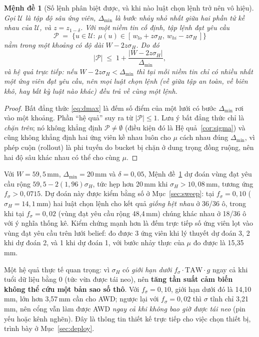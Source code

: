 \documentclass[10pt]{article}
\newtheorem{proposition}{Mệnh đề}[theorem]
\begin{document}
\begin{proposition}[Số lệnh phân biệt được, và khi nào luật chọn lệnh trở nên vô hiệu]
\label{prop:dmax}
Gọi $\mathcal{U}$ là tập độ sâu ứng viên, $\Delta_{\min}$ là bước nhảy nhỏ nhất giữa hai phần tử kề nhau của $\mathcal{U}$, và $z=z_{1-\delta}$. Với một niềm tin cố định, tập lệnh đạt yêu cầu
\[
\mathcal{P} \;=\; \big\{u\in\mathcal{U}:\ \mu(u) \in [\,w_{lo}+z\sigma_H,\ w_{hi}-z\sigma_H\,]\big\}
\]
nằm trong một khoảng có độ dài $W-2z\sigma_H$. Do đó
\begin{equation}
|\mathcal{P}| \;\le\; 1 + \frac{|W-2z\sigma_H|}{\Delta_{\min}},
\label{eq:dmax}
\end{equation}
và hệ quả trực tiếp: nếu $W-2z\sigma_H < \Delta_{\min}$ thì tại \emph{mỗi} niềm tin chỉ có nhiều nhất một ứng viên đạt yêu cầu, nên \emph{mọi} luật chọn lệnh (về giữa tập an toàn, về biên khô, hay bất kỳ luật nào khác) đều trả về cùng một lệnh.
\end{proposition}
\begin{proof}
Bất đẳng thức \eqref{eq:dmax} là đếm số điểm của một lưới có bước $\Delta_{\min}$ rơi vào một khoảng. Phần ``hệ quả'' suy ra từ $|\mathcal{P}|\le 1$. Lưu ý bất đẳng thức chỉ là \emph{chặn trên}; nó không khẳng định $\mathcal{P}\neq\emptyset$ (điều kiện đó là Hệ quả~\ref{cor:sigma}) và cũng không khẳng định hai ứng viên kề nhau luôn cho $\mu$ cách nhau đúng $\Delta_{\min}$, vì phép cuộn (rollout) là phi tuyến do bucket bị chặn ở dung trọng đồng ruộng, nên hai độ sâu khác nhau có thể cho cùng $\mu$.
\end{proof}

Với $W=59{,}5$\,mm, $\Delta_{\min}=20$\,mm và $\delta=0{,}05$, Mệnh đề~\ref{prop:dmax} dự đoán vùng đạt yêu cầu rộng $59{,}5-2(1{,}96)\sigma_H$, tức hẹp hơn 20\,mm khi $\sigma_H>10{,}08$\,mm, tương ứng $f_\sigma>0{,}0715$. Dự đoán này được kiểm bằng số ở Mục~\ref{sec:sweep}: tại $f_\sigma=0{,}10$ ($\sigma_H=14{,}1$\,mm) hai luật chọn lệnh cho kết quả \emph{giống hệt nhau} ở 36/36 ô, trong khi tại $f_\sigma=0{,}02$ (vùng đạt yêu cầu rộng 48,4\,mm) chúng khác nhau ở 18/36 ô với ý nghĩa thống kê. Kiểm chứng mạnh hơn là đếm trực tiếp số ứng viên lọt vào vùng đạt yêu cầu trên lưới belief: đo được 3 ứng viên khi lý thuyết dự đoán 3, 2 khi dự đoán 2, và 1 khi dự đoán 1, với bước nhảy thực của $\mu$ đo được là 15,35\,mm.

Một hệ quả thực tế quan trọng: vì $\sigma_H$ có \emph{giới hạn dưới} $f_\sigma\cdot\mathrm{TAW}\cdot g$ ngay cả khi tuổi dữ liệu bằng 0 (tức vừa được tái neo), nên \textbf{tăng tần suất cảm biến không thể cứu một bản sao số thô}. Với $f_\sigma=0{,}10$, giới hạn dưới đó là 14,10\,mm, lớn hơn 3,57\,mm cần cho AWD; ngược lại với $f_\sigma=0{,}02$ thì $\sigma$ tĩnh chỉ 3,21\,mm, nên cổng vẫn làm được AWD \emph{ngay cả khi không bao giờ được tái neo} (pin yếu hoặc kênh nghẽn). Đây là thông tin thiết kế trực tiếp cho việc chọn thiết bị, trình bày ở Mục~\ref{sec:deploy}.
\end{document}
